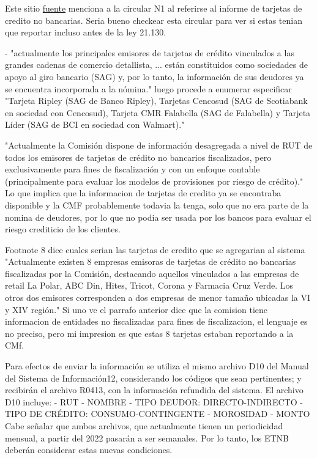\documentclass[12pt]{article}
\theoremstyle{plain}
\theoremstyle{plain}
\theoremstyle{definition}  %
\theoremstyle{remark}  %
\begin{document}
 


Este sitio \href{https://www.cmfchile.cl/portal/estadisticas/617/w3-propertyvalue-29526.html}{fuente} menciona a la circular N1 al referirse al informe de tarjetas de credito no bancarias. Seria bueno checkear esta circular para ver si estas tenian que reportar incluso antes de la ley 21.130. 





- "actualmente los principales emisores de tarjetas de crédito vinculados a las grandes cadenas de comercio detallista, ...  están constituidos como sociedades de apoyo al giro bancario (SAG) y, por lo tanto, la información de sus deudores ya se encuentra incorporada a la nómina." luego procede a enumerar especificar "Tarjeta Ripley (SAG de Banco Ripley), Tarjetas Cencosud (SAG de Scotiabank en sociedad con Cencosud), Tarjeta CMR Falabella (SAG de Falabella) y Tarjeta Líder (SAG de BCI en sociedad con Walmart)." 

"Actualmente la Comisión dispone de información desagregada a nivel de RUT de todos los emisores de tarjetas de crédito no bancarios fiscalizados, pero exclusivamente para fines de fiscalización y con un enfoque contable (principalmente para  evaluar los modelos de provisiones por riesgo de crédito)." Lo que implica que la informacion de tarjetas de credito ya se encontraba disponible y la CMF probablemente todavia la tenga, solo que no era parte de la nomina de deudores, por lo que no podia ser usada por los bancos para evaluar el riesgo crediticio de los clientes.

Footnote 8 dice cuales serian las tarjetas de credito que se agregarian al sistema "Actualmente existen 8 empresas emisoras de tarjetas de crédito no bancarias fiscalizadas por la Comisión, destacando aquellos vinculados a las empresas de retail La Polar, ABC Din, Hites, Tricot, Corona y Farmacia Cruz Verde. Los otros dos  emisores corresponden a dos empresas de menor tamaño ubicadas la VI y XIV región." Si uno ve el parrafo anterior dice que la comision tiene informacion de entidades no fiscalizadas para fines de fiscalizacion, el lenguaje es no preciso, pero mi impresion es que estas 8 tarjetas estaban reportando a la CMf. 


Para efectos de enviar la información se utiliza el mismo archivo D10 del Manual del Sistema de Información12, considerando los códigos que sean pertinentes; y recibirán el archivo R0413, con la información refundida del sistema.  El archivo D10 incluye: - RUT - NOMBRE - TIPO DEUDOR: DIRECTO-INDIRECTO - TIPO DE CRÉDITO: CONSUMO-CONTINGENTE - MOROSIDAD - MONTO   Cabe señalar que ambos archivos, que actualmente tienen un periodicidad mensual, a partir del 2022 pasarán a ser semanales. Por lo tanto, los ETNB deberán considerar estas nuevas condiciones.
\end{document}
